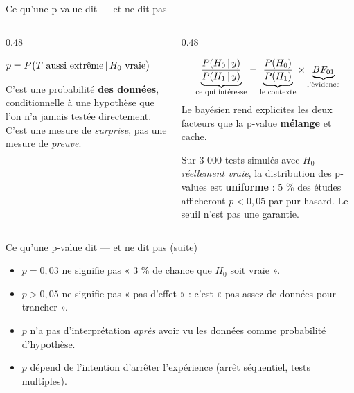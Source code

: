\begin{frame}{Ce qu'une p-value dit — et ne dit pas}
\begin{columns}[t]
\begin{column}{0.48\textwidth}
\begin{solbox}
$p = P\big(T \text{ aussi extrême} \,\vert\, H_0 \text{ vraie}\big)$

\vspace{1mm}
C'est une probabilité \textbf{des données}, conditionnelle à une hypothèse
que l'on n'a jamais testée directement. C'est une mesure de
\emph{surprise}, pas une mesure de \emph{preuve}.
\end{solbox}
\end{column}
\begin{column}{0.48\textwidth}
\begin{kbox}
\[
\underbrace{\frac{P(H_0 \,\vert\, y)}{P(H_1 \,\vert\, y)}}_{\text{ce qui intéresse}}
=
\underbrace{\frac{P(H_0)}{P(H_1)}}_{\text{le contexte}}
\times
\underbrace{BF_{01}}_{\text{l'évidence}}
\]
Le bayésien rend explicites les deux facteurs que la p-value
\textbf{mélange} et cache.
\end{kbox}
\begin{ebox}
Sur 3 000 tests simulés avec $H_0$ \emph{réellement vraie}, la distribution
des p-values est \textbf{uniforme} : 5 \% des études afficheront $p < 0{,}05$
par pur hasard. Le seuil n'est pas une garantie.
\end{ebox}
\end{column}
\end{columns}
\end{frame}

\begin{frame}{Ce qu'une p-value dit — et ne dit pas (suite)}
\begin{wbox}
\begin{itemize}
  \item \nok{} $p = 0{,}03$ ne signifie pas « 3 \% de chance que $H_0$ soit vraie ».
  \item \nok{} $p > 0{,}05$ ne signifie pas « pas d'effet » : c'est
        « pas assez de données pour trancher ».
  \item \nok{} $p$ n'a pas d'interprétation \emph{après} avoir vu les données
        comme probabilité d'hypothèse.
  \item \nok{} $p$ dépend de l'intention d'arrêter l'expérience (arrêt séquentiel,
        tests multiples).
\end{itemize}
\end{wbox}
\end{frame}

